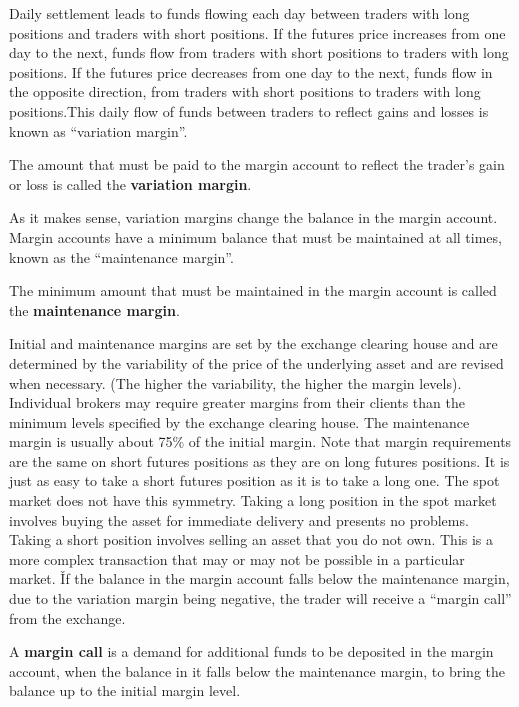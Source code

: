 Daily settlement leads to funds flowing each day between traders with long positions and traders with short positions.
If the futures price increases from one day to the next, funds flow from traders with short positions to traders with
long positions. If the futures price decreases from one day to the next, funds flow in the opposite direction, from
traders with short positions to traders with long positions.This daily flow of funds between traders to reflect gains
and losses is known as ``variation margin''.

The amount that must be paid to the margin account to reflect the trader's gain or loss is called the \textbf{variation
margin}.
\ed

As it makes sense, variation margins change the balance in the margin account. Margin accounts have a minimum balance
that must be maintained at all times, known as the ``maintenance margin''.

The minimum amount that must be maintained in the margin account is called the \textbf{maintenance margin}.
\ed

Initial and maintenance margins are set by the exchange clearing house and are determined by the variability of the
price of the underlying asset and are revised when necessary. (The higher the variability, the higher the margin
levels). Individual brokers may require greater margins from their clients than the minimum levels specified by the
exchange clearing house. The maintenance margin is usually about 75\% of the initial margin. Note that margin
requirements are the same on short futures positions as they are on long futures positions. It is just as easy to
take a short futures position as it is to take a long one. The spot market does not have this symmetry. Taking a
long position in the spot market involves buying the asset for immediate delivery and presents no problems. Taking a
short position involves selling an asset that you do not own. This is a more complex transaction that may or may not
be possible in a particular market. \v

If the balance in the margin account falls below the maintenance margin, due to the variation margin being negative,
the trader will receive a ``margin call'' from the exchange.

A \textbf{margin call} is a demand for additional funds to be deposited in the margin account, when the balance in it
falls below the maintenance margin, to bring the balance up to the initial margin level.
\ed

